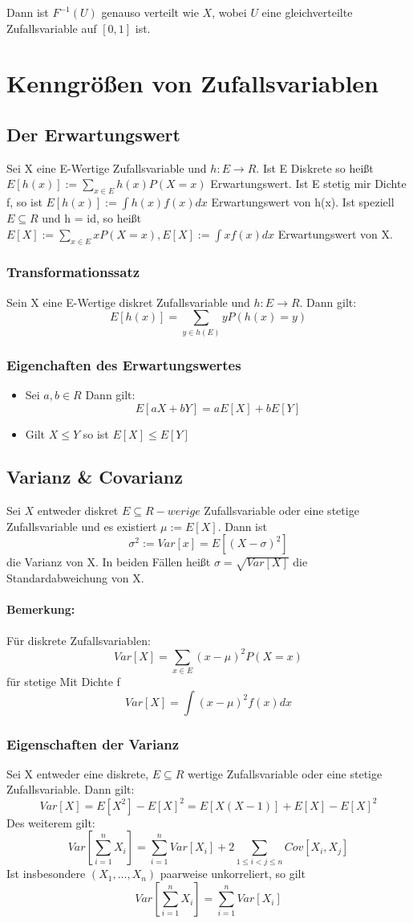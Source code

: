 \documentclass{report}
\begin{document}
Dann ist \(F^{-1}(U)\) genauso verteilt wie \(X\), wobei \(U\) eine gleichverteilte Zufallsvariable auf \([0, 1]\) ist.

\chapter*{Kenngrößen von Zufallsvariablen}
\section*{Der Erwartungswert}
Sei X eine E-Wertige Zufallsvariable und $h:E \rightarrow R$. Ist E Diskrete so heißt $E[h(x)] := \sum_{x \in E} h(x)P(X = x)$ Erwartungswert. Ist E stetig mir Dichte f, so ist $E[h(x)] := \int h(x)f(x)dx$ Erwartungswert von h(x).
Ist speziell $E \subseteq R$ und h = id, so heißt $E[X] := \sum_{x \in E} xP(X=x), E[X]:= \int xf(x)dx$ Erwartungswert von X.
\subsection*{Transformationssatz}
Sein X eine E-Wertige diskret Zufallsvariable und $h : E \rightarrow R$. Dann gilt: \[E[h(x)] = \sum_{y \in h(E)} yP(h(x) = y)\]
\subsection*{Eigenchaften des Erwartungswertes}
\begin{itemize}
    \item {Sei $a, b \in R$ Dann gilt: \[E[aX+bY] = aE[X]+bE[Y]\]}
    \item {Gilt $X\leq Y$ so ist $E[X]\leq E[Y]$}
\end{itemize}
\section*{Varianz \& Covarianz}
Sei $X$ entweder diskret $E \subseteq R-werige$ Zufallsvariable oder eine stetige Zufallsvariable und es existiert $\mu := E[X]$. Dann ist \[\sigma^2 := Var[x] = E[(X-\sigma)^2]\]
die Varianz von X. In beiden Fällen heißt $\sigma = \sqrt{Var[X]}$ die Standardabweichung von X. 
\subsubsection*{Bemerkung:}
Für diskrete Zufallsvariablen: \[Var[X] = \sum_{x \in E}(x-\mu)^2P(X=x)\]
für stetige Mit Dichte f \[Var[X] = \int(x-\mu)^2f(x)dx\]
\subsection*{Eigenschaften der Varianz}
Sei X entweder eine diskrete, $E \subseteq R$ wertige Zufallsvariable oder eine stetige Zufallsvariable. Dann gilt: \[Var[X] = E[X^2] - E[X]^2 = E[X(X - 1)] + E[X] - E[X]^2\]
Des weiterem gilt: \[Var[\sum_{i=1}^{n} X_i] = \sum_{i=1}^{n} Var[X_i]+2 \sum_{1 \leq i < j \leq n}Cov[X_i, X_j]\]
Ist insbesondere $(X_1, ..., X_n)$ paarweise unkorreliert, so gilt \[Var[\sum_{i=1}^{n}X_i] = \sum_{i=1}^{n} Var[X_i]\]
\end{document}
